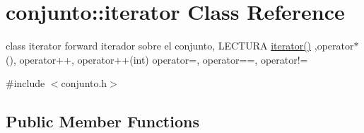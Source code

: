 \hypertarget{classconjunto_1_1iterator}{\section{conjunto\-:\-:iterator Class Reference}
\label{classconjunto_1_1iterator}
}


class iterator forward iterador sobre el conjunto, L\-E\-C\-T\-U\-R\-A \hyperlink{classconjunto_1_1iterator_ae3ade272e78f6888c39ad44a8b4b152a}{iterator()} ,operator$\ast$(), operator++, operator++(int) operator=, operator==, operator!=  




{\ttfamily \#include $<$conjunto.\-h$>$}

\subsection*{Public Member Functions}
